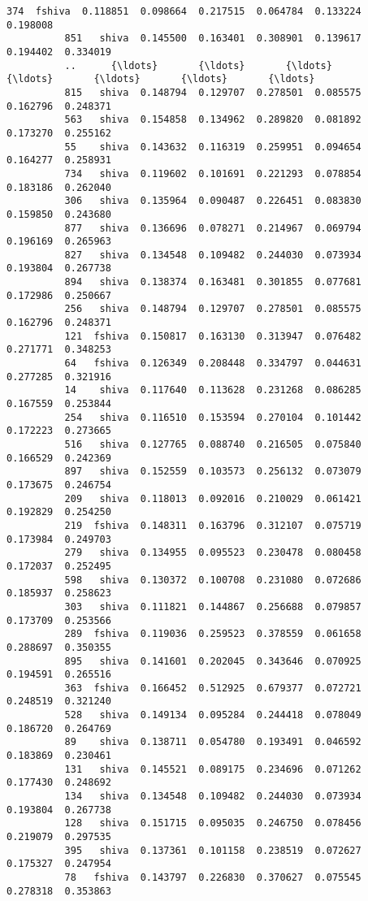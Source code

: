 \documentclass[11pt]{article}
\begin{document}
\begin{Verbatim}[commandchars=\\\{\}]
          374  fshiva  0.118851  0.098664  0.217515  0.064784  0.133224  0.198008   
          851   shiva  0.145500  0.163401  0.308901  0.139617  0.194402  0.334019   
          ..      {\ldots}       {\ldots}       {\ldots}       {\ldots}       {\ldots}       {\ldots}       {\ldots}   
          815   shiva  0.148794  0.129707  0.278501  0.085575  0.162796  0.248371   
          563   shiva  0.154858  0.134962  0.289820  0.081892  0.173270  0.255162   
          55    shiva  0.143632  0.116319  0.259951  0.094654  0.164277  0.258931   
          734   shiva  0.119602  0.101691  0.221293  0.078854  0.183186  0.262040   
          306   shiva  0.135964  0.090487  0.226451  0.083830  0.159850  0.243680   
          877   shiva  0.136696  0.078271  0.214967  0.069794  0.196169  0.265963   
          827   shiva  0.134548  0.109482  0.244030  0.073934  0.193804  0.267738   
          894   shiva  0.138374  0.163481  0.301855  0.077681  0.172986  0.250667   
          256   shiva  0.148794  0.129707  0.278501  0.085575  0.162796  0.248371   
          121  fshiva  0.150817  0.163130  0.313947  0.076482  0.271771  0.348253   
          64   fshiva  0.126349  0.208448  0.334797  0.044631  0.277285  0.321916   
          14    shiva  0.117640  0.113628  0.231268  0.086285  0.167559  0.253844   
          254   shiva  0.116510  0.153594  0.270104  0.101442  0.172223  0.273665   
          516   shiva  0.127765  0.088740  0.216505  0.075840  0.166529  0.242369   
          897   shiva  0.152559  0.103573  0.256132  0.073079  0.173675  0.246754   
          209   shiva  0.118013  0.092016  0.210029  0.061421  0.192829  0.254250   
          219  fshiva  0.148311  0.163796  0.312107  0.075719  0.173984  0.249703   
          279   shiva  0.134955  0.095523  0.230478  0.080458  0.172037  0.252495   
          598   shiva  0.130372  0.100708  0.231080  0.072686  0.185937  0.258623   
          303   shiva  0.111821  0.144867  0.256688  0.079857  0.173709  0.253566   
          289  fshiva  0.119036  0.259523  0.378559  0.061658  0.288697  0.350355   
          895   shiva  0.141601  0.202045  0.343646  0.070925  0.194591  0.265516   
          363  fshiva  0.166452  0.512925  0.679377  0.072721  0.248519  0.321240   
          528   shiva  0.149134  0.095284  0.244418  0.078049  0.186720  0.264769   
          89    shiva  0.138711  0.054780  0.193491  0.046592  0.183869  0.230461   
          131   shiva  0.145521  0.089175  0.234696  0.071262  0.177430  0.248692   
          134   shiva  0.134548  0.109482  0.244030  0.073934  0.193804  0.267738   
          128   shiva  0.151715  0.095035  0.246750  0.078456  0.219079  0.297535   
          395   shiva  0.137361  0.101158  0.238519  0.072627  0.175327  0.247954   
          78   fshiva  0.143797  0.226830  0.370627  0.075545  0.278318  0.353863   
          

\end{Verbatim}
\end{document}
